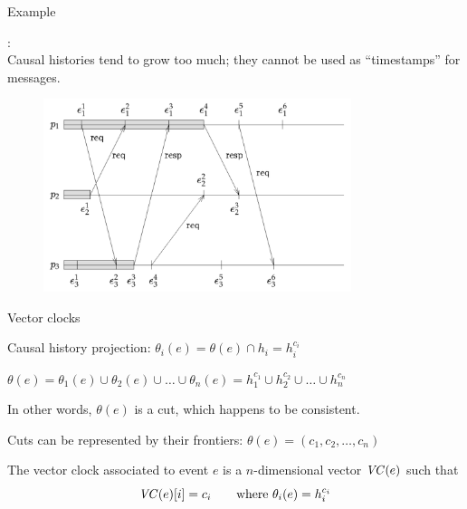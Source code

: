\begin{frame}{Example}

: \\	
Causal histories tend to grow too much; they cannot be used as ``timestamps'' for messages.

\begin{figure} 
\includegraphics[width=9cm]{figs/02/figure-6}
\end{figure}
\end{frame}

\begin{frame}{Vector clocks}
\BI
\item Causal history projection: $\theta_i(e) = \theta(e) \cap h_i = h_i^{c_i}$
\item $\theta(e) = \theta_1(e) \cup \theta_2(e) \cup \ldots \cup \theta_n(e) = h_1^{c_1} \cup h_2^{c_2} \cup \ldots \cup h_n^{c_n}$
\item In other words, $\theta(e)$ is a cut, which happens to be consistent.
\item Cuts can be represented by their frontiers: $\theta(e) = (c_1, c_2, \ldots, c_n)$
\EI

\begin{definition}
The \alert{vector clock} associated to event $e$ is a $n$-dimensional vector $\mathit{VC}(e)$ such that
\[
  \mathit{VC}(e)[i] = c_i \qquad \mbox{where $\theta_i(e) = h_i^{c_i}$}
\]
\end{definition}


\end{frame}

